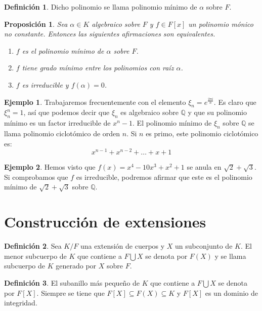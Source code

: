 \documentclass{report}
\newtheorem{proposition}[theorem]{Proposición}
\theoremstyle{remark}
\theoremstyle{definition}
\newtheorem{definition}{Definición}[chapter]
\theoremstyle{definition}
\theoremstyle{definition}
\newtheorem*{example}{Ejemplo}
\begin{document}
\begin{definition}
    Dicho polinomio se llama polinomio mínimo de $\alpha$ sobre $F$.
\end{definition}

\begin{proposition}
    Sea $\alpha \in K$ algebraico sobre $F$ y $f \in F[x]$ un polinomio mónico no constante.
    Entonces las siguientes afirmaciones son equivalentes.
    \begin{enumerate}
        \item $f$ es el polinomio mínimo de $\alpha$ sobre $F$.
        \item $f$ tiene grado mínimo entre los polinomios con raíz $\alpha$.
        \item $f$ es irreducible y $f(\alpha) = 0$.
    \end{enumerate}
\end{proposition}

\begin{example}
    Trabajaremos frecuentemente con el elemento $\xi_n = e^{\frac{2\pi i}{n}}$. Es claro que $\xi_n^n = 1$, así que podemos decir que $\xi_n$ es algebraico sobre $\mathbb{Q}$ y que su polinomio mínimo es un factor irreducible de $x^n - 1$.
    El polinomio mínimo de $\xi_n$ sobre $\mathbb{Q}$ se llama polinomio ciclotómico de orden $n$. Si $n$ es primo, este polinomio ciclotómico es:
    $$x^{n-1} + x^{n-2} + \dots + x + 1$$
\end{example}

\begin{example}
    Hemos visto que $f(x) = x^4 - 10x^3 + x^2 + 1$ se anula en $\sqrt{2} + \sqrt{3}$. Si comprobamos que $f$ es irreducible, podremos afirmar que este es el polinomio mínimo de $\sqrt{2} + \sqrt{3}$ sobre $\mathbb{Q}$.
\end{example}

\section{Construcción de extensiones}

\begin{definition}
    Sea $K/F$ una extensión de cuerpos y $X$ un subconjunto de $K$.
    El menor subcuerpo de $K$ que contiene a $F \bigcup X$ se denota por $F(X)$ y se llama subcuerpo de $K$ generado por $X$ sobre $F$.
\end{definition}

\begin{definition}
    El subanillo más pequeño de $K$ que contiene a $F \bigcup X$ se denota por $F[X]$.
    Siempre se tiene que $F[X] \subseteq F(X) \subseteq K$ y $F[X]$ es un dominio de integridad.
\end{definition}
\end{document}
